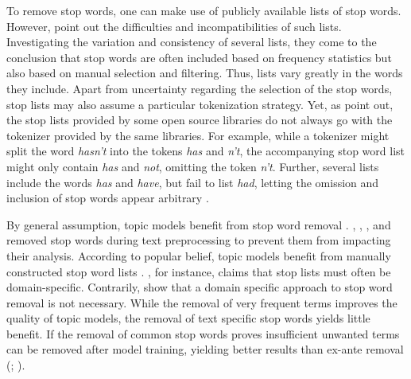 \documentclass[11pt,a4paper,english,oneside]{book}
\numberwithin{equation}{chapter}
\begin{document}
To remove stop words, one can make use of publicly available lists of stop words. However, \citet{Nothman.2018} point out the difficulties and incompatibilities of such lists. Investigating the variation and consistency of several lists, they come to the conclusion that stop words are often included based on frequency statistics but also based on manual selection and filtering. Thus, lists vary greatly in the words they include. Apart from uncertainty regarding the selection of the stop words, stop lists may also assume a particular tokenization strategy. Yet, as \citet{Nothman.2018} point out, the stop lists provided by some open source libraries do not always go with the tokenizer provided by the same libraries. For example, while a tokenizer might split the word \textit{hasn't} into the tokens \textit{has} and \textit{n't}, the accompanying stop word list might only contain \textit{has} and \textit{not}, omitting the token \textit{n't}. Further, several lists include the words \textit{has} and \textit{have}, but fail to list \textit{had}, letting the omission and inclusion of stop words appear arbitrary \citep[pp. 7--11]{Nothman.2018}.  

By general assumption, topic models benefit from stop word removal \cite[p. 432]{SchofieldA.MagnussonM.&MimnoD..2017}. \cite{Blei.2003}, \cite{Chem.2007}, \cite{Steyvers(2007)}, and \cite{Hofmann.2001} removed stop words during text preprocessing to prevent them from impacting their analysis. According to popular belief, topic models benefit from manually constructed stop word lists \cite[p. 432]{SchofieldA.MagnussonM.&MimnoD..2017}. \citet[p. 7]{Darling.2011}, for instance, claims that stop lists must often be domain-specific. Contrarily, \cite{SchofieldA.MagnussonM.&MimnoD..2017} show that a domain specific approach to stop word removal is not necessary. While the removal of very frequent terms improves the quality of topic models, the removal of text specific stop words yields little benefit. If the removal of common stop words proves insufficient unwanted terms can be removed after model training, yielding better results than ex-ante removal (\citealp[p. 432]{SchofieldA.MagnussonM.&MimnoD..2017}; \citealp{Schofield.2017}).
\end{document}
